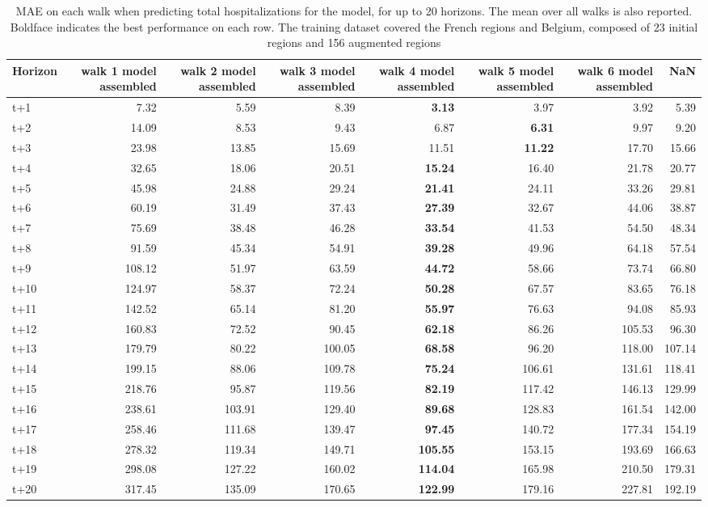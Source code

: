 \begin{table}[H]
\centering
\caption{MAE on each walk when predicting total hospitalizations for the model, for up to 20 horizons. The mean over all walks is also reported. Boldface indicates the best performance on each row. The training dataset covered the French regions and Belgium, composed of 23 initial regions and 156 augmented regions }
\label{tab:MAE_walk_assembly}
\begin{tabular}{lrrrrrrr}
\toprule
Horizon &  walk 1 model assembled &  walk 2 model assembled &  walk 3 model assembled &  walk 4 model assembled &  walk 5 model assembled &  walk 6 model assembled &    NaN \\
\midrule
t+1  & 7.32  & 5.59  & 8.39  & \textbf{3.13}  & 3.97  & 3.92  & 5.39  \\
t+2  & 14.09  & 8.53  & 9.43  & 6.87  & \textbf{6.31}  & 9.97  & 9.20  \\
t+3  & 23.98  & 13.85  & 15.69  & 11.51  & \textbf{11.22}  & 17.70  & 15.66  \\
t+4  & 32.65  & 18.06  & 20.51  & \textbf{15.24}  & 16.40  & 21.78  & 20.77  \\
t+5  & 45.98  & 24.88  & 29.24  & \textbf{21.41}  & 24.11  & 33.26  & 29.81  \\
t+6  & 60.19  & 31.49  & 37.43  & \textbf{27.39}  & 32.67  & 44.06  & 38.87  \\
t+7  & 75.69  & 38.48  & 46.28  & \textbf{33.54}  & 41.53  & 54.50  & 48.34  \\
t+8  & 91.59  & 45.34  & 54.91  & \textbf{39.28}  & 49.96  & 64.18  & 57.54  \\
t+9  & 108.12  & 51.97  & 63.59  & \textbf{44.72}  & 58.66  & 73.74  & 66.80  \\
t+10  & 124.97  & 58.37  & 72.24  & \textbf{50.28}  & 67.57  & 83.65  & 76.18  \\
t+11  & 142.52  & 65.14  & 81.20  & \textbf{55.97}  & 76.63  & 94.08  & 85.93  \\
t+12  & 160.83  & 72.52  & 90.45  & \textbf{62.18}  & 86.26  & 105.53  & 96.30  \\
t+13  & 179.79  & 80.22  & 100.05  & \textbf{68.58}  & 96.20  & 118.00  & 107.14  \\
t+14  & 199.15  & 88.06  & 109.78  & \textbf{75.24}  & 106.61  & 131.61  & 118.41  \\
t+15  & 218.76  & 95.87  & 119.56  & \textbf{82.19}  & 117.42  & 146.13  & 129.99  \\
t+16  & 238.61  & 103.91  & 129.40  & \textbf{89.68}  & 128.83  & 161.54  & 142.00  \\
t+17  & 258.46  & 111.68  & 139.47  & \textbf{97.45}  & 140.72  & 177.34  & 154.19  \\
t+18  & 278.32  & 119.34  & 149.71  & \textbf{105.55}  & 153.15  & 193.69  & 166.63  \\
t+19  & 298.08  & 127.22  & 160.02  & \textbf{114.04}  & 165.98  & 210.50  & 179.31  \\
t+20  & 317.45  & 135.09  & 170.65  & \textbf{122.99}  & 179.16  & 227.81  & 192.19  \\

\bottomrule
\end{tabular}
\end{table}
